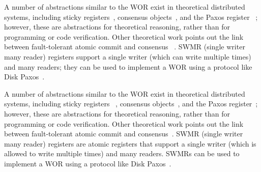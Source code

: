 
 A number of abstractions similar to the WOR exist in theoretical distributed systems,
 including sticky registers~\cite{stickyregister}, consensus objects~\cite{herlihy1991wait}, and the Paxos register~
 \cite{li2007paxos}; however, these are abstractions for theoretical reasoning, rather than for programming or code 
 verification. Other theoretical work points out the link between fault-tolerant atomic commit and consensus~
 \cite{frolund2001implementing, hadzilacos1990relationship}. SWMR (single writer many reader) registers support a 
 single writer (which can write multiple times) and many readers; they can  be used to implement a WOR using a 
 protocol like Disk Paxos~\cite{diskpaxos}.

A number of abstractions similar to the WOR exist in theoretical distributed systems, including sticky registers~
\cite{stickyregister}, consensus objects~\cite{herlihy1991wait}, and the Paxos register~\cite{li2007paxos}; however, 
these are abstractions for theoretical reasoning, rather than for programming or code verification. Other theoretical 
work points out the link between fault-tolerant atomic commit and consensus~\cite{frolund2001implementing, 
hadzilacos1990relationship}. SWMR (single writer many reader) registers are atomic registers that support a single 
writer (which is allowed to write multiple times) and many readers. SWMRs can be used to implement a WOR using a 
protocol like Disk Paxos~\cite{diskpaxos}.

